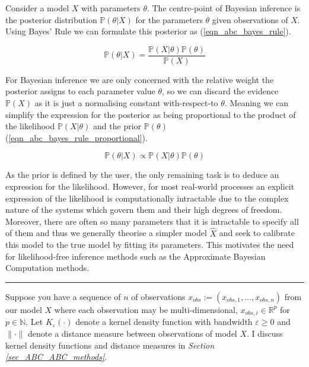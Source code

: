 \documentclass[11pt,a4paper]{article}
\newcommand*{\prob}{\mathbb{P}}
\theoremstyle{break}
\begin{document}
  \par Consider a model $X$ with parameters $\theta$. The centre-point of Bayesian inference is the posterior distribution $\prob(\theta|X)$ for the parameters $\theta$ given observations of $X$. Using Bayes' Rule we can formulate this posterior as (\ref{eqn_abc_bayes_rule}).

  \begin{equation}\label{eqn_abc_bayes_rule}
    \prob(\theta|X)=\frac{\prob(X|\theta)\prob(\theta)}{\prob(X)}
  \end{equation}

  \par For Bayesian inference we are only concerned with the relative weight the posterior assigns to each parameter value $\theta$, so we can discard the evidence $\prob(X)$ as it is just a normalising constant with-respect-to $\theta$. Meaning we can simplify the expression for the posterior as being proportional to  the product of the likelihood $\prob(X|\theta)$ and the prior $\prob(\theta)$ (\ref{eqn_abc_bayes_rule_proportional}).

  \begin{equation}\label{eqn_abc_bayes_rule_proportional}
    \prob(\theta|X)\propto\prob(X|\theta)\prob(\theta)
  \end{equation}

  \par As the prior is defined by the user, the only remaining task is to deduce an expression for the likelihood. However, for most real-world processes an explicit expression of the likelihood is computationally intractable due to the complex nature of the systems which govern them and their high degrees of freedom. Moreover, there are often so many parameters that it is intractable to specify all of them and thus we generally theorise a simpler model $\hat{X}$ and seek to calibrate this model to the true model by fitting its parameters. This motivates the need for likelihood-free inference methods such as the Approximate Bayesian Computation methods.

  \begin{center}
    \noindent\rule{.8\textwidth}{0.4pt}
  \end{center}

  \noindent Suppose you have a sequence of $n$ of observations $x_{obs}:=(x_{obs,1},\dots,x_{obs,n})$ from our model $X$ where each observation may be multi-dimensional, $x_{obs,i}\in\mathbb{R}^p$ for $p\in\mathbb{N}$. Let $K_\varepsilon(\cdot)$ denote a kernel density function with bandwidth $\varepsilon\geq0$ and $\|\cdot\|$ denote a distance measure between observations of model $X$. I discuss kernel density functions and distance measures in \textit{Section \ref{sec_ABC_ABC_methods}}.
\end{document}
